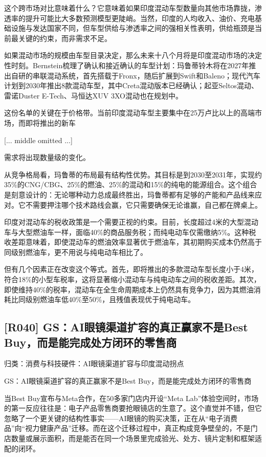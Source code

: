 \documentclass[11pt]{ctexart}
\begin{document}
这个跨市场对比意味着什么？它意味着如果印度混动车型数量向其他市场靠拢，渗透率的提升可能比大多数预测模型更陡峭。当然，印度的人均收入、油价、充电基础设施与发达国家不同，但车型供给与渗透率之间的强相关性表明，供给瓶颈是当前最关键的约束，而非需求不足。

如果混动市场的规模由车型目录决定，那么未来十八个月将是印度混动市场的决定性时刻。Bernstein梳理了确认和接近确认的车型计划：玛鲁蒂铃木将在2027年推出自研的串联混动系统，首先搭载于Fronx，随后扩展到Swift和Baleno；现代汽车计划到2030年推出8款混动车型，其中Creta混动版本已经确认；起亚Seltos混动、雷诺Duster E-Tech、马恒达XUV 3XO混动也在规划中。

这份名单的关键在于价格带。当前印度混动车型主要集中在25万卢比以上的高端市场，而即将推出的新车

[... middle omitted ...]

需求将出现数量级的变化。

从竞争格局看，玛鲁蒂的布局最有结构性优势。其目标是到2030至2031年，实现约35\%的CNG/CBG、25\%的燃油、25\%的混动和15\%的纯电的能源组合。这个组合是刻意设计的：无论哪种动力总成最终胜出，玛鲁蒂都有足够的产能和产品线来应对。它不需要押注哪个技术路线会赢，它只需要确保无论谁赢，自己都在牌桌上。

印度对混动车的税收政策是一个需要正视的约束。目前，长度超过4米的大型混动车与大型燃油车一样，面临40\%的商品服务税；而纯电动车仅需缴纳5\%。这种税收差距意味着，即使混动车的燃油效率显著优于燃油车，其初期购买成本仍然高于同级别燃油车，更不用说与纯电动车相比了。

但有几个因素正在改变这个等式。首先，即将推出的多款混动车型长度小于4米，符合18\%的小型车税率，这将显著缩小混动车与纯电动车之间的税收差距。其次，即使维持40\%的税率，混动车在全生命周期成本上仍然具有竞争力，因为其燃油消耗比同级别燃油车低40\%至50\%，且残值表现优于纯电动车。

\subsection{[R040] GS：AI眼镜渠道扩容的真正赢家不是Best Buy，而是能完成处方闭环的零售商}
{\small\color{refgray}归类：消费与科技硬件：AI眼镜渠道扩容与印度混动拐点}

GS：AI眼镜渠道扩容的真正赢家不是Best Buy，而是能完成处方闭环的零售商

当Best Buy宣布与Meta合作，在50多家门店内开设“Meta Lab”体验空间时，市场的第一反应往往是：电子产品零售商要抢眼镜店的生意了。这个直觉并不错，但它忽略了一个更关键的结构性事实——AI眼镜的购买决策，正在从“电子消费品”向“视力健康产品”迁移。而在这个迁移过程中，真正构成竞争壁垒的，不是门店数量或展示面积，而是能否在同一个场景里完成验光、处方、镜片定制和框架适配的闭环。
\end{document}
